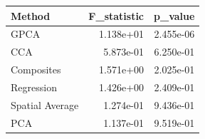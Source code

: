 \begin{tabular}{lrr}
\toprule
Method & F_statistic & p_value \\
\midrule
GPCA & 1.138e+01 & 2.455e-06 \\
CCA & 5.873e-01 & 6.250e-01 \\
Composites & 1.571e+00 & 2.025e-01 \\
Regression & 1.426e+00 & 2.409e-01 \\
Spatial Average & 1.274e-01 & 9.436e-01 \\
PCA & 1.137e-01 & 9.519e-01 \\
\bottomrule
\end{tabular}
